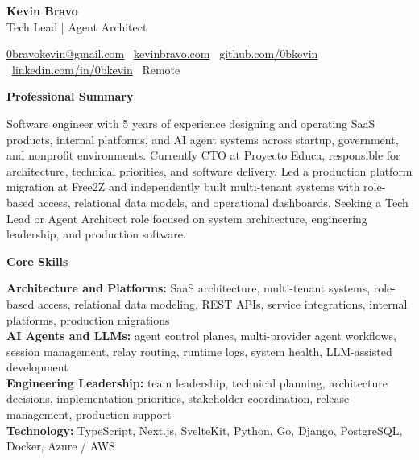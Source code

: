 \documentclass[11pt]{article}
\begin{document}
\begin{center}
    {\LARGE \textbf{Kevin Bravo}}\\
    Tech Lead | Agent Architect \\
    \hrulefill
\end{center}

\begin{center}
    \href{mailto:0bravokevin@gmail.com}{0bravokevin@gmail.com}
    \textbullet\
    \href{https://kevinbravo.com}{kevinbravo.com}
    \textbullet\
    \href{https://github.com/0bkevin}{github.com/0bkevin}
    \textbullet\
    \href{https://www.linkedin.com/in/0bkevin/}{linkedin.com/in/0bkevin}
    \textbullet\
Remote
\end{center}

\vspace{4pt}
\begin{center}
    \textbf{Professional Summary}
\end{center}
\vspace{-4pt}
Software engineer with 5 years of experience designing and operating SaaS products, internal platforms, and AI agent systems across startup, government, and nonprofit environments. Currently CTO at Proyecto Educa, responsible for architecture, technical priorities, and software delivery. Led a production platform migration at Free2Z and independently built multi-tenant systems with role-based access, relational data models, and operational dashboards. Seeking a Tech Lead or Agent Architect role focused on system architecture, engineering leadership, and production software.

\vspace{8pt}
\begin{center}
    \textbf{Core Skills}
\end{center}
\vspace{-4pt}
\textbf{Architecture and Platforms:} SaaS architecture, multi-tenant systems, role-based access, relational data modeling, REST APIs, service integrations, internal platforms, production migrations \\
\textbf{AI Agents and LLMs:} agent control planes, multi-provider agent workflows, session management, relay routing, runtime logs, system health, LLM-assisted development \\
\textbf{Engineering Leadership:} team leadership, technical planning, architecture decisions, implementation priorities, stakeholder coordination, release management, production support \\
\textbf{Technology:} TypeScript, Next.js, SvelteKit, Python, Go, Django, PostgreSQL, Docker, Azure / AWS
\end{document}
